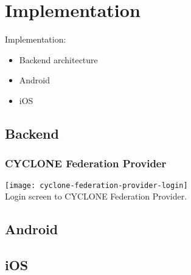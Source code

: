 \chapter{Implementation}
\label{cha:implementation}

Implementation:
\begin{itemize}
    \item Backend architecture
    \item Android
    \item iOS
\end{itemize}

\hline


\vspace{0.5cm}

\section{Backend}

\subsection{CYCLONE Federation Provider}

\begin{center}
    \texttt{[image: cyclone-federation-provider-login]}\\
    Login screen to CYCLONE Federation Provider.
\end{center}


\vspace{0.5cm}

\section{Android}


\vspace{0.5cm}

\section{iOS}